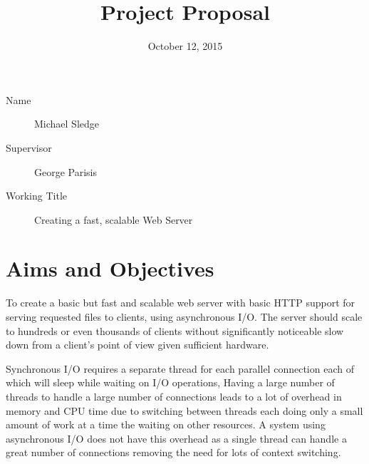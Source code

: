\documentclass{article}
\begin{document}
\title{Project Proposal}
\date{October 12, 2015}
\maketitle
\begin{description}
	\item[Name] Michael Sledge
	\item[Supervisor] George Parisis
	\item[Working Title] Creating a fast, scalable Web Server
\end{description}
\section{Aims and Objectives}
\begin{comment}
Could you please update the proposal to include some more in the aims and objectives section? More specifically, we want to see what are your general aims and expected outcome from this project; i.e. why are you doing it and what do you expect to get out of it. Also, please write some more on the project objectives. Async I/O is very good but I am sure you can be a bit more specific about other aspects (e.g. scalability, response times). why async I/O is good compared to multi-threading etc..
\end{comment}

\begin{comment}
aims describe purpose and intention and include a description of your motivations for undertaking this particular topic. Objectives relate to the expected outcomes of the project. You should break these down into 'primary objectives' which you guarantee to achieve and 'extensions' which will only be implemented if time allows. The primary objectives should be clearly specified, but the extensions may be vaguer. Do not be afraid to specify more extensions than you will be able to implement.
\end{comment}

To create a basic but fast and scalable web server with basic HTTP support for serving requested files to clients, using asynchronous I/O. The server should scale to hundreds or even thousands of clients without significantly noticeable slow down from a client's point of view given sufficient hardware.

Synchronous I/O requires a separate thread for each parallel connection each of which will sleep while waiting on I/O operations, Having a large number of threads to handle a large number of connections leads to a lot of overhead in memory and CPU time due to switching between threads each doing only a small amount of work at a time the waiting on other resources. A system using asynchronous I/O does not have this overhead as a single thread can handle a great number of connections removing the need for lots of context switching.
\end{document}
